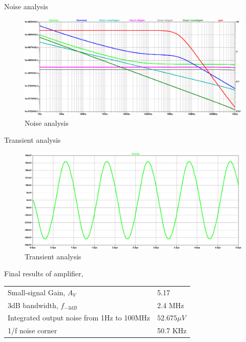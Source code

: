 \documentclass{article}
\begin{document}
Noise analysis
\begin{figure}[H]
\centering
\includegraphics[width=.9\linewidth]{img/q4/noise.pdf}
\caption{\label{fig:noise-q4}Noise analysis}
\end{figure}

Transient analysis
\begin{figure}[H]
\centering
\includegraphics[width=.9\linewidth]{img/q4/trans.pdf}
\caption{\label{fig:transient-q4}Transient analysis}
\end{figure}

Final results of amplifier,
\begin{center}
\begin{tabular}{ll}
\hline
Small-signal Gain, \(A_{V}\) & 5.17\\
3dB bandwidth, \(f_{-3dB}\) & 2.4 MHz\\
Integrated output noise from 1Hz to 100MHz & \(52.675 \mu{}V\)\\
1/f noise corner & 50.7 KHz\\
\hline
\end{tabular}
\end{center}
\end{document}
